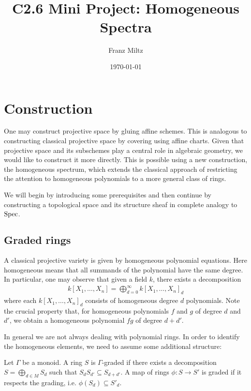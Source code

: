 \documentclass{article}
\begin{document}
\title{C2.6 Mini Project: Homogeneous Spectra}
\author{Franz Miltz}
\date{\today}
\maketitle

\section{Construction}

One may construct projective space by gluing affine schemes.
This is analogous to constructing classical projective space by covering
using affine charts. Given that projective space and its subschemes
play a central role in algebraic geometry, we would like to construct
it more directly. This is possible using a new construction, the
homogeneous spectrum, which extends the classical approach of restricting
the attention to homogeneous polynomials to a more general class of rings.

We will begin by introducing some prerequisites and then continue by
constructing a topological space and its structure sheaf in
complete analogy to $\operatorname{Spec}$.

\subsection{Graded rings}

A classical projective variety is given by homogeneous polynomial
equations. Here homogeneous means that all summands of the polynomial
have the same degree. In particular, one may observe that given a field $k$,
there exists a decomposition
\begin{align*}
  k[X_1,\ldots,X_n] = \bigoplus_{d=0}^\infty k[X_1,\ldots,X_n]_d
\end{align*}
where each $k[X_1,\ldots,X_n]_d$ consists of homogeneous degree $d$
polynomials. Note the crucial property that, for homogeneous polynomials $f$
and $g$ of degree $d$ and $d'$, we obtain a homogeneous polynomial $fg$ of
degree $d+d'$.

In general we are not always dealing with polynomial rings. In order
to identify the homogeneous elements, we need to assume some
additional structure:

\begin{definition}
  Let $\Gamma$ be a monoid.
  A ring $S$ is $\Gamma$-graded if there exists a decomposition
  $S = \bigoplus_{d\in M} S_d$
  such that $S_d S_{d'} \subseteq S_{d+d'}$.
  A map of rings $\phi : S\to S'$ is graded if it
  respects the grading, i.e. $\phi(S_d) \subseteq S'_d$.
\end{definition}
\end{document}

